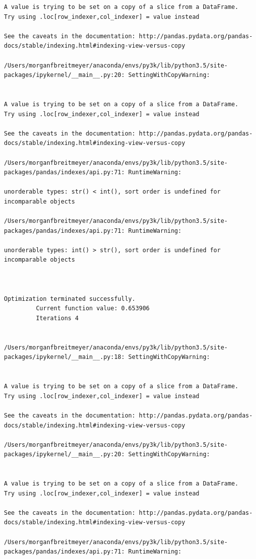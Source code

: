 \begin{lstlisting}
A value is trying to be set on a copy of a slice from a DataFrame.
Try using .loc[row_indexer,col_indexer] = value instead

See the caveats in the documentation: http://pandas.pydata.org/pandas-docs/stable/indexing.html#indexing-view-versus-copy

/Users/morganfbreitmeyer/anaconda/envs/py3k/lib/python3.5/site-packages/ipykernel/__main__.py:20: SettingWithCopyWarning:


A value is trying to be set on a copy of a slice from a DataFrame.
Try using .loc[row_indexer,col_indexer] = value instead

See the caveats in the documentation: http://pandas.pydata.org/pandas-docs/stable/indexing.html#indexing-view-versus-copy

/Users/morganfbreitmeyer/anaconda/envs/py3k/lib/python3.5/site-packages/pandas/indexes/api.py:71: RuntimeWarning:

unorderable types: str() < int(), sort order is undefined for incomparable objects

/Users/morganfbreitmeyer/anaconda/envs/py3k/lib/python3.5/site-packages/pandas/indexes/api.py:71: RuntimeWarning:

unorderable types: int() > str(), sort order is undefined for incomparable objects



Optimization terminated successfully.
         Current function value: 0.653906
         Iterations 4


/Users/morganfbreitmeyer/anaconda/envs/py3k/lib/python3.5/site-packages/ipykernel/__main__.py:18: SettingWithCopyWarning:


A value is trying to be set on a copy of a slice from a DataFrame.
Try using .loc[row_indexer,col_indexer] = value instead

See the caveats in the documentation: http://pandas.pydata.org/pandas-docs/stable/indexing.html#indexing-view-versus-copy

/Users/morganfbreitmeyer/anaconda/envs/py3k/lib/python3.5/site-packages/ipykernel/__main__.py:20: SettingWithCopyWarning:


A value is trying to be set on a copy of a slice from a DataFrame.
Try using .loc[row_indexer,col_indexer] = value instead

See the caveats in the documentation: http://pandas.pydata.org/pandas-docs/stable/indexing.html#indexing-view-versus-copy

/Users/morganfbreitmeyer/anaconda/envs/py3k/lib/python3.5/site-packages/pandas/indexes/api.py:71: RuntimeWarning:


\end{lstlisting}
